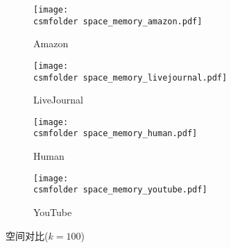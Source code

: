 \begin{figure}[h!]
\def\wscorevone{0.35}
\centering
    \begin{subfigure}[t]{\wscorevone\linewidth}
	    \centering
	    \resizebox{\linewidth}{!}
	    {
	        \texttt{[image: \\csmfolder space\_memory\_amazon.pdf]}
	    }
	    \caption{Amazon}
	    \label{fig:exp:space:memory:amazon}
    \end{subfigure}
    \begin{subfigure}[t]{\wscorevone\linewidth}
        \centering
        \resizebox{\linewidth}{!}
        {
            \texttt{[image: \\csmfolder space\_memory\_livejournal.pdf]}
        }
        \caption{LiveJournal}
        \label{fig:exp:space:memory:livejournal}
    \end{subfigure}
     \begin{subfigure}[t]{\wscorevone\linewidth}
         \centering
         \resizebox{\linewidth}{!}
         {
             \texttt{[image: \\csmfolder space\_memory\_human.pdf]}
         }
         \caption{Human}
         \label{fig:exp:space:memory:human}
     \end{subfigure}
     \begin{subfigure}[t]{\wscorevone\linewidth}
         \centering
         \resizebox{\linewidth}{!}
         {
             \texttt{[image: \\csmfolder space\_memory\_youtube.pdf]}
         }
         \caption{YouTube}
         \label{fig:exp:space:memory:youtube}
     \end{subfigure}
\caption{空间对比($k=100$)}
\label{fig:exp:space:memory}
\end{figure}